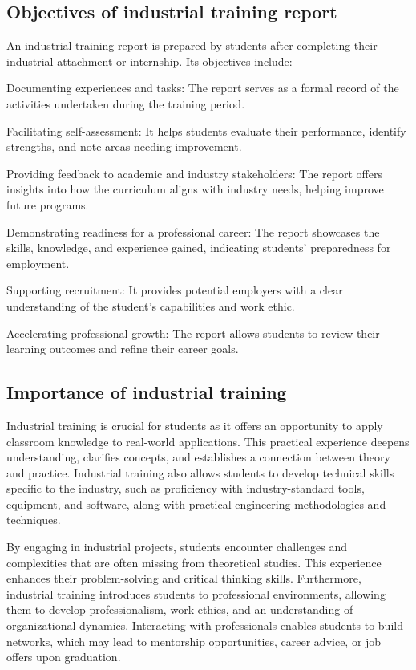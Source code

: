 \subsection{Objectives of industrial training report}
An industrial training report is prepared by students after completing their industrial attachment or internship. Its objectives include:

Documenting experiences and tasks: The report serves as a formal record of the activities undertaken during the training period.

Facilitating self-assessment: It helps students evaluate their performance, identify strengths, and note areas needing improvement.

Providing feedback to academic and industry stakeholders: The report offers insights into how the curriculum aligns with industry needs, helping improve future programs.

Demonstrating readiness for a professional career: The report showcases the skills, knowledge, and experience gained, indicating students’ preparedness for employment.

Supporting recruitment: It provides potential employers with a clear understanding of the student’s capabilities and work ethic.

Accelerating professional growth: The report allows students to review their learning outcomes and refine their career goals.

\subsection{Importance of industrial training}
Industrial training is crucial for students as it offers an opportunity to apply classroom knowledge to real-world applications. This practical experience deepens understanding, clarifies concepts, and establishes a connection between theory and practice. Industrial training also allows students to develop technical skills specific to the industry, such as proficiency with industry-standard tools, equipment, and software, along with practical engineering methodologies and techniques.

By engaging in industrial projects, students encounter challenges and complexities that are often missing from theoretical studies. This experience enhances their problem-solving and critical thinking skills. Furthermore, industrial training introduces students to professional environments, allowing them to develop professionalism, work ethics, and an understanding of organizational dynamics. Interacting with professionals enables students to build networks, which may lead to mentorship opportunities, career advice, or job offers upon graduation.

